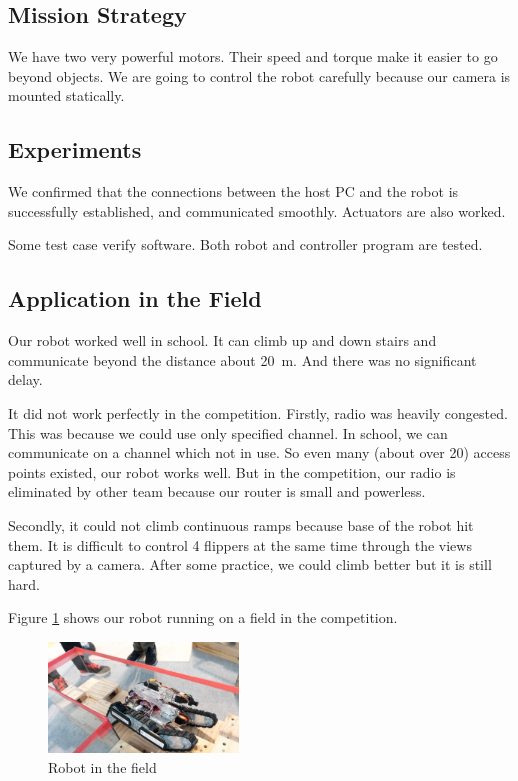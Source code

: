 \documentclass[journal]{IEEEtran}
\begin{document}
\subsection{Mission Strategy}
We have two very powerful motors.
Their speed and torque make it easier to go beyond objects.
We are going to control the robot carefully because our camera is mounted statically.

\subsection{Experiments}
We confirmed that the connections between the host PC and the robot is successfully established, and communicated smoothly.
Actuators are also worked.

Some test case verify software.
Both robot and controller program are tested.

\subsection{Application in the Field}
Our robot worked well in school.
It can climb up and down stairs and communicate beyond the distance about \SI{20}{\metre}.
And there was no significant delay.

It did not work perfectly in the competition.
Firstly, radio was heavily congested.
This was because we could use only specified channel.
In school, we can communicate on a channel which not in use.
So even many (about over 20) access points existed, our robot works well.
But in the competition, our radio is eliminated by other team because our router is small and powerless.

Secondly, it could not climb continuous ramps because base of the robot hit them.
It is difficult to control 4 flippers at the same time through the views captured by a camera.
After some practice, we could climb better but it is still hard.

Figure \ref{fig:robotAndField} shows our robot running on a field in the competition.
\begin{figure}[!t]
    \centering
    \includegraphics[width=0.45\textwidth]{robotAndField.png}
    \caption{Robot in the field} \label{fig:robotAndField}
\end{figure}
\end{document}
